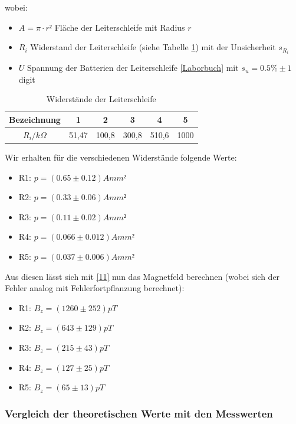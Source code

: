 \documentclass[12pt]{article}
\begin{document}
wobei:

\begin{itemize}
\item $A = \pi \cdot r² $ Fläche der Leiterschleife mit Radius $r$
\item $R_i$ Widerstand der Leiterschleife (siehe Tabelle \ref{Tab}) mit der Unsicherheit $s_{R_i}$
\item$U$ Spannung der Batterien der Leiterschleife \ref{Laborbuch} mit $s_u = 0.5 \% \pm 1$ digit
\end{itemize}

\begin{table}[h!]
	\centering
	\begin{tabular}{c|c|c|c|c|c}
	Bezeichnung& 1& 2& 3& 4& 5 \\ \hline
	$R_i/k \Omega$ & 51,47&	100,8& 300,8 & 510,6 & 1000\\ 
	\end{tabular} 
\caption{Widerstände der Leiterschleife}	\label{Tab}
\end{table}


Wir erhalten für die verschiedenen Widerstände folgende Werte: 

\begin{itemize}
\item R1: $p = (0.65 \pm 0.12) A mm²$
\item R2: $p = (0.33 \pm 0.06) A mm²$
\item R3: $p = (0.11 \pm 0.02) A mm²$
\item R4: $p = (0.066 \pm 0.012) A mm²$
\item R5: $p = (0.037 \pm 0.006) A mm²$
\end{itemize}

Aus diesen lässt sich mit \ref{11} nun das Magnetfeld berechnen (wobei sich der Fehler analog mit Fehlerfortpflanzung berechnet):

\begin{itemize}
\item R1: $B_z = (1260 \pm 252) pT$
\item R2: $B_z = (643 \pm 129) pT$
\item R3: $B_z = (215 \pm 43 ) pT$
\item R4: $B_z = (127 \pm 25) pT$
\item R5: $B_z = (65 \pm 13) pT$
\end{itemize}

\subsubsection{Vergleich der theoretischen Werte mit den Messwerten }
\end{document}

